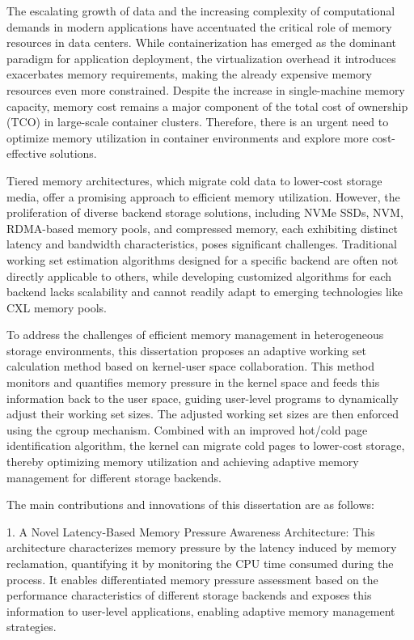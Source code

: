 \begin{englishabstract}

The escalating growth of data and the increasing complexity of computational demands in modern applications have accentuated the critical role of memory resources in data centers. While containerization has emerged as the dominant paradigm for application deployment, the virtualization overhead it introduces exacerbates memory requirements, making the already expensive memory resources even more constrained. Despite the increase in single-machine memory capacity, memory cost remains a major component of the total cost of ownership (TCO) in large-scale container clusters. Therefore, there is an urgent need to optimize memory utilization in container environments and explore more cost-effective solutions.

Tiered memory architectures, which migrate cold data to lower-cost storage media, offer a promising approach to efficient memory utilization. However, the proliferation of diverse backend storage solutions, including NVMe SSDs, NVM, RDMA-based memory pools, and compressed memory, each exhibiting distinct latency and bandwidth characteristics, poses significant challenges. Traditional working set estimation algorithms designed for a specific backend are often not directly applicable to others, while developing customized algorithms for each backend lacks scalability and cannot readily adapt to emerging technologies like CXL memory pools.

To address the challenges of efficient memory management in heterogeneous storage environments, this dissertation proposes an adaptive working set calculation method based on kernel-user space collaboration. This method monitors and quantifies memory pressure in the kernel space and feeds this information back to the user space, guiding user-level programs to dynamically adjust their working set sizes. The adjusted working set sizes are then enforced using the cgroup mechanism. Combined with an improved hot/cold page identification algorithm, the kernel can migrate cold pages to lower-cost storage, thereby optimizing memory utilization and achieving adaptive memory management for different storage backends.

The main contributions and innovations of this dissertation are as follows:

1. A Novel Latency-Based Memory Pressure Awareness Architecture: This architecture characterizes memory pressure by the latency induced by memory reclamation, quantifying it by monitoring the CPU time consumed during the process. It enables differentiated memory pressure assessment based on the performance characteristics of different storage backends and exposes this information to user-level applications, enabling adaptive memory management strategies.


\end{englishabstract}
